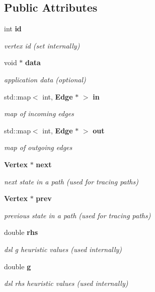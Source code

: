 \subsection*{\-Public \-Attributes}
\begin{DoxyCompactItemize}
\item 
int {\bf id}
\begin{DoxyCompactList}\small\item\em vertex id (set internally) \end{DoxyCompactList}\item 
void $\ast$ {\bf data}
\begin{DoxyCompactList}\small\item\em application data (optional) \end{DoxyCompactList}\item 
std\-::map$<$ int, {\bf \-Edge} $\ast$ $>$ {\bf in}
\begin{DoxyCompactList}\small\item\em map of incoming edges \end{DoxyCompactList}\item 
std\-::map$<$ int, {\bf \-Edge} $\ast$ $>$ {\bf out}
\begin{DoxyCompactList}\small\item\em map of outgoing edges \end{DoxyCompactList}\item 
{\bf \-Vertex} $\ast$ {\bf next}
\begin{DoxyCompactList}\small\item\em next state in a path (used for tracing paths) \end{DoxyCompactList}\item 
{\bf \-Vertex} $\ast$ {\bf prev}
\begin{DoxyCompactList}\small\item\em previous state in a path (used for tracing paths) \end{DoxyCompactList}\item 
double {\bf rhs}
\begin{DoxyCompactList}\small\item\em dsl g heuristic values (used internally) \end{DoxyCompactList}\item 
double {\bf g}
\begin{DoxyCompactList}\small\item\em dsl rhs heuristic values (used internally) \end{DoxyCompactList}\end{DoxyCompactItemize}
